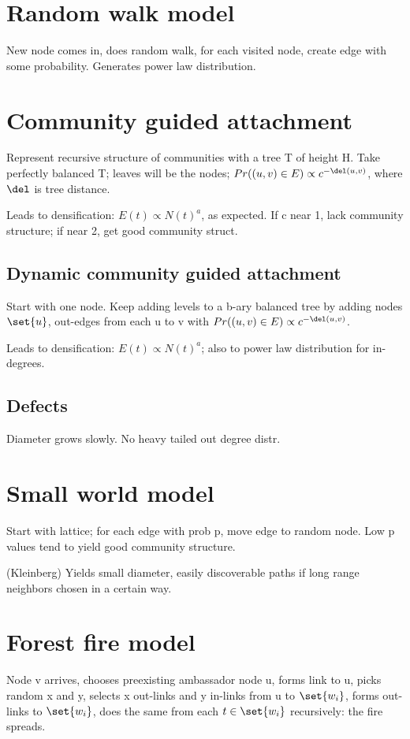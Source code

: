 \documentclass[oneside, article]{memoir}
\begin{document}
\section{Random walk model}
New node comes in, does random walk, for each visited node, create edge with some probability. Generates power law distribution.

\section{Community guided attachment}
Represent recursive structure of communities with a tree T of height H. Take perfectly balanced T; leaves will be the nodes; $Pr((u,v) \in E) \propto c^{-\del(u,v)}$, where $\del$ is tree distance.

Leads to densification: $E(t) \propto N(t)^{a}$, as expected. If c near 1, lack community structure; if near 2, get good community struct.

\subsection{Dynamic community guided attachment}
Start with one node. Keep adding levels to a b-ary balanced tree by adding nodes $\set{u}$, out-edges from each u to v with $Pr((u,v) \in E) \propto c^{-\del(u,v)}$.

Leads to densification: $E(t) \propto N(t)^{a}$; also to power law distribution for in-degrees.

\subsection{Defects}
Diameter grows slowly. No heavy tailed out degree distr.

\section{Small world model}
Start with lattice; for each edge with prob p, move edge to random node. Low p values tend to yield good community structure.

(Kleinberg) Yields small diameter, easily discoverable paths if long range neighbors chosen in a certain way.

\section{Forest fire model}
Node v arrives, chooses preexisting ambassador node u, forms link to u, picks random x and y, selects x out-links and y in-links from u to $\set{w_{i}}$, forms out-links to $\set{w_{i}}$, does the same from each $t\in \set{w_{i}}$ recursively: the fire spreads.
\end{document}
